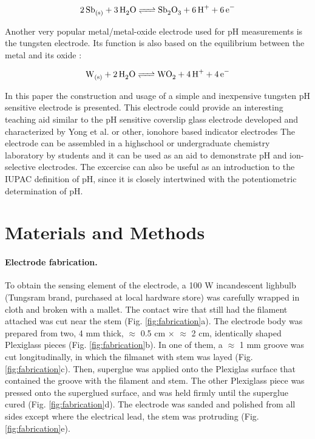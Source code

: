 \documentclass[manuscript=article, journal=jceda8]{achemso}
\begin{document}
\begin{equation}
        \ce{2Sb_{(s)} + 3H_2O <=> Sb_2O_3 + 6H^+ + 6e^-}
\end{equation}

Another very popular metal/metal-oxide electrode used for pH measurements is the tungsten electrode. Its function is also based on the equilibrium between the metal and its oxide \cite{kriksunov1994tungsten}:

\begin{equation}
        \ce{W_{(s)} + 2H_2O <=> WO_2 + 4H^+ + 4e^-}
\end{equation}

In this paper the construction and usage of a simple and inexpensive tungsten pH sensitive electrode is presented. This electrode could provide an interesting teaching aid similar to the pH sensitive coverslip glass electrode developed and characterized by Yong et al. \cite{yong2019simple} or other, ionohore based indicator electrodes \cite{goldcamp2010inexpensive, marafie2007plastic}
The electrode can be assembled in a highschool or undergraduate chemistry laboratory by students and it can be used as an aid to demonstrate pH and ion-selective electrodes. The excercise can also be useful as an introduction to the IUPAC definition of pH, since it is closely intertwined with the potentiometric determination of pH.


\section{Materials and Methods}
\paragraph{Electrode fabrication.}

To obtain the sensing element of the electrode, a 100 W incandescent lighbulb (Tungsram brand, purchased at local hardware store) was carefully wrapped in cloth and broken with a mallet. The contact wire that still had the filament attached was cut near the stem (Fig. \ref{fig:fabrication}a). The electrode body was prepared from two, 4 mm thick, $\approx$ 0.5 cm $\times$ $\approx$ 2 cm, identically shaped Plexiglass pieces (Fig. \ref{fig:fabrication}b). In one of them, a $\approx$ 1 mm groove was cut longitudinally, in which the filmanet with stem was layed (Fig. \ref{fig:fabrication}c). Then, superglue was applied onto the Plexiglas surface that contained the groove with the filament and stem. The other Plexiglass piece was pressed onto the superglued surface, and was held firmly until the superglue cured (Fig. \ref{fig:fabrication}d). The electrode was sanded and polished from all sides except where the electrical lead, the stem was protruding (Fig. \ref{fig:fabrication}e).
\end{document}
